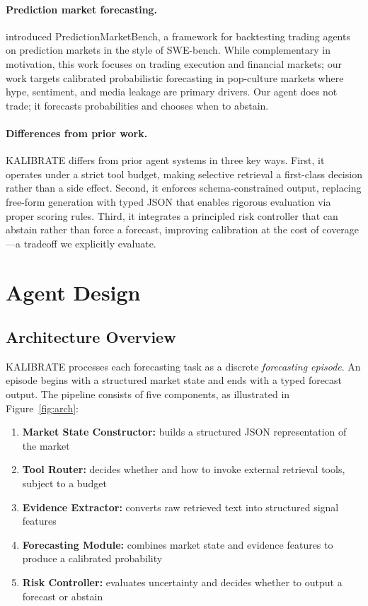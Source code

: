 \documentclass{article} %
\newcommand{\agentname}{KALIBRATE}
\begin{document}
\paragraph{Prediction market forecasting.}
\citet{arora2026predictionmarketbench} introduced PredictionMarketBench, a framework for backtesting trading agents on prediction markets in the style of SWE-bench. While complementary in motivation, this work focuses on trading execution and financial markets; our work targets calibrated probabilistic forecasting in pop-culture markets where hype, sentiment, and media leakage are primary drivers. Our agent does not trade; it forecasts probabilities and chooses when to abstain.

\paragraph{Differences from prior work.}
\agentname{} differs from prior agent systems in three key ways. First, it operates under a strict tool budget, making selective retrieval a first-class decision rather than a side effect. Second, it enforces schema-constrained output, replacing free-form generation with typed JSON that enables rigorous evaluation via proper scoring rules. Third, it integrates a principled risk controller that can abstain rather than force a forecast, improving calibration at the cost of coverage—a tradeoff we explicitly evaluate.

\section{Agent Design}
\label{sec:design}

\subsection{Architecture Overview}

\agentname{} processes each forecasting task as a discrete \textit{forecasting episode}. An episode begins with a structured market state and ends with a typed forecast output. The pipeline consists of five components, as illustrated in Figure~\ref{fig:arch}:

\begin{enumerate}[noitemsep]
    \item \textbf{Market State Constructor:} builds a structured JSON representation of the market
    \item \textbf{Tool Router:} decides whether and how to invoke external retrieval tools, subject to a budget
    \item \textbf{Evidence Extractor:} converts raw retrieved text into structured signal features
    \item \textbf{Forecasting Module:} combines market state and evidence features to produce a calibrated probability
    \item \textbf{Risk Controller:} evaluates uncertainty and decides whether to output a forecast or abstain
\end{enumerate}
\end{document}
